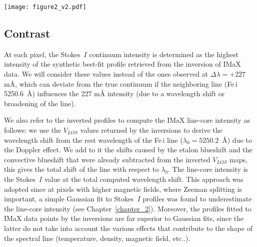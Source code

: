 \documentclass[goettingen, gauss, print]{thesis}
\begin{document}
\begin{landscape}
\begin{figure*}
\centering
\texttt{[image: figure2\_v2.pdf]}
\caption{The SuFI images coaligned to the IMaX FOV shown in Figure~\ref{fig1}. (a) SuFI 300 nm. (b) SuFI Ca\,{\sc ii} H. (c) IMaX continuum intensity (normalized to the mean quiet-Sun intensity) to which SuFI 300 nm (overlaid in red) is aligned. (d) IMaX line-core intensity derived from the inversions (see Section~\ref{contrast}) and normalized to the local continuum ($I_{+227}$), and to which calcium images (overlaid in yellow) are aligned. The yellow and red boxes are slightly misaligned due to the differential offsets in the SuFI wavelegnth channels. The gray scale is set to cover two times the rms range of each image.} 
\label{fig2}
\end{figure*}
\end{landscape}

\subsection{Contrast}
\label{contrast}
At each pixel, the Stokes~$I$ continuum intensity is determined as the highest intensity of the synthetic best-fit profile retrieved from the inversion of IMaX data. We will consider these values instead of the ones observed at $\Delta \lambda = +227$\,m\AA{}, which can deviate from the true continuum if the neighboring line (Fe\,{\sc i} 5250.6\, \AA{}) influences the 227 m\AA{} intensity (due to a wavelength shift or broadening of the line).

We also refer to the inverted profiles to compute the IMaX line-core intensity as follows: we use the $V_{LOS}$ values returned by the inversions to derive the wavelength shift from the rest wavelength of the Fe\,{\sc i} line ($\lambda_0=5250.2$\, \AA{}) due to the Doppler effect. We add to it the shifts caused by the etalon blueshift and the convective blueshift that were already subtracted from the inverted $V_{LOS}$ maps, this gives the total shift of the line with respect to $\lambda_0$. The line-core intensity is the Stokes~$I$ value at the total computed wavelength shift. This approach was adopted since at pixels with higher magnetic fields, where Zeeman splitting is important, a simple Gaussian fit to Stokes~$I$ profiles was found to underestimate the line-core intensity (see Chapter~\ref{chapter_2}). Moreover, the profiles fitted to IMaX data points by the inversions are far superior to Gaussian fits, since the latter do not take into account the various effects that contribute to the shape of the spectral line (temperature, density, magnetic field, etc..).
\end{document}
